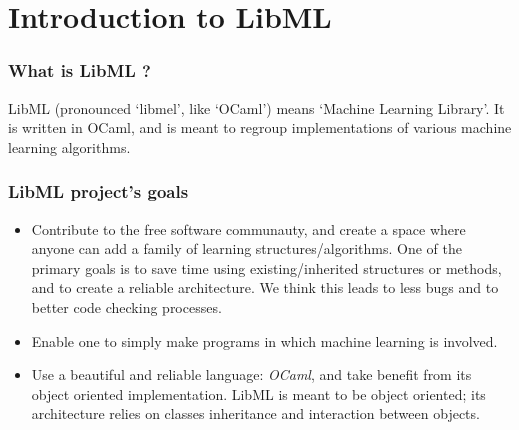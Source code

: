 \part{Introduction to LibML}
\setcounter{chapter}{1}
\section{What is LibML ?}
LibML (pronounced `libmel', like `OCaml') means `Machine Learning Library'.
It is written in OCaml, and is meant to regroup implementations of various
machine learning algorithms.

\section{LibML project's goals}
\begin{itemize}
\item Contribute to the free software communauty, and create a space where
anyone can add a family of learning structures/algorithms. One of the primary
goals is to save time using existing/inherited structures or methods, and to create
a reliable architecture. We think this leads to less bugs and to better code
checking processes.
\item Enable one to simply make programs in which machine learning
is involved.
\item Use a beautiful and reliable language: \textit{OCaml}, and take benefit
from its object oriented implementation. LibML is meant to
be object oriented; its architecture relies on classes inheritance and
interaction between objects.
\end{itemize}

\newpage
